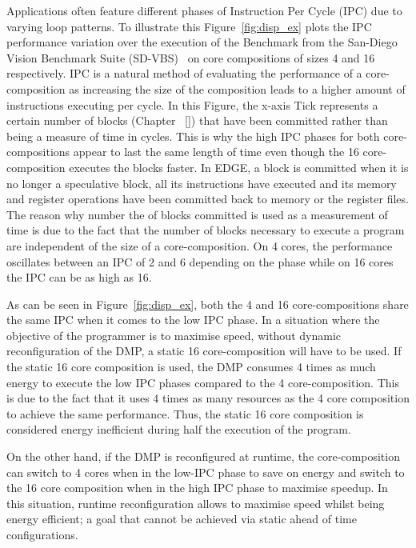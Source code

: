 Applications often feature different phases of Instruction Per Cycle (IPC) due to varying loop patterns.
To illustrate this Figure~\ref{fig:disp_ex} plots the IPC performance variation over the execution of the  Benchmark from the San-Diego Vision Benchmark Suite (SD-VBS)~\cite{sdvbs} on core compositions of sizes 4 and 16 respectively.
IPC is a natural method of evaluating the performance of a core-composition as increasing the size of the composition leads to a higher amount of instructions executing per cycle.
In this Figure, the x-axis Tick represents a certain number of blocks (Chapter ~\ref{}) that have been committed rather than being a measure of time in cycles.
This is why the high IPC phases for both core-compositions appear to last the same length of time even though the 16 core-composition executes the blocks faster.
In EDGE, a block is committed when it is no longer a speculative block, all its instructions have executed and its memory and register operations have been committed back to memory or the register files.
The reason why number the of blocks committed is used as a measurement of time is due to the fact that the number of blocks necessary to execute a program are independent of the size of a core-composition.
On 4 cores, the performance oscillates between an IPC of 2 and 6 depending on the phase while on 16 cores the IPC can be as high as 16.

As can be seen in Figure~\ref{fig:disp_ex}, both the 4 and 16 core-compositions share the same IPC when it comes to the low IPC phase.
In a situation where the objective of the programmer is to maximise speed, without dynamic reconfiguration of the DMP, a static 16 core-composition will have to be used.
If the static 16 core composition is used, the DMP consumes 4 times as much energy to execute the low IPC phases compared to the 4 core-composition.
This is due to the fact that it uses 4 times as many resources as the 4 core composition to achieve the same performance.
Thus, the static 16 core composition is considered energy inefficient during half the execution of the program.

On the other hand, if the DMP is reconfigured at runtime, the core-composition can switch to 4 cores when in the low-IPC phase to save on energy and switch to the 16 core composition when in the high IPC phase to maximise speedup.
In this situation, runtime reconfiguration allows to maximise speed whilst being energy efficient; a goal that cannot be achieved via static ahead of time configurations.

